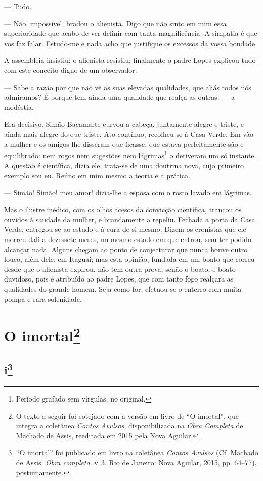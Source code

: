 --- Tudo.

--- Não, impossível, bradou o alienista. Digo que não sinto em mim essa
superioridade que acabo de ver definir com tanta magnificência. A
simpatia é que vos faz falar. Estudo-me e nada acho que justifique os
excessos da vossa bondade.

A assembleia insistiu; o alienista resistiu; finalmente o padre Lopes
explicou tudo com este conceito digno de um observador:

--- Sabe a razão por que não vê as suas elevadas qualidades, que aliás
todos nós admiramos? É porque tem ainda uma qualidade que realça as
outras: --- a modéstia.

Era decisivo. Simão Bacamarte curvou a cabeça, juntamente alegre e
triste, e ainda mais alegre do que triste. Ato contínuo, recolheu-se à
Casa Verde. Em vão a mulher e os amigos lhe disseram que ficasse, que
estava perfeitamente são e equilibrado: nem rogos nem sugestões nem
lágrimas\footnote{Período grafado sem vírgulas, no original.} o
detiveram um só instante. A questão é científica, dizia ele; trata-se de
uma doutrina nova, cujo primeiro exemplo sou eu. Reúno em mim mesmo a
teoria e a prática.

--- Simão! Simão! meu amor! dizia-lhe a esposa com o rosto lavado em
lágrimas.

Mas o ilustre médico, com os olhos acesos da convicção científica,
trancou os ouvidos à saudade da mulher, e brandamente a repeliu. Fechada
a porta da Casa Verde, entregou-se ao estudo e à cura de si mesmo. Dizem
os cronistas que ele morreu dali a dezessete meses, no mesmo estado em
que entrou, sem ter podido alcançar nada. Alguns chegam ao ponto de
conjecturar que nunca houve outro louco, além dele, em Itaguaí; mas esta
opinião, fundada em um boato que correu desde que o alienista expirou,
não tem outra prova, senão o boato; e boato duvidoso, pois é atribuído
ao padre Lopes, que com tanto fogo realçara as qualidades do grande
homem. Seja como for, efetuou-se o enterro com muita pompa e rara
solenidade.


\chapter{O imortal\footnote[*]{O texto a seguir foi cotejado com a versão
  em livro de ``O imortal'', que integra a coletânea \emph{Contos
  Avulsos}, disponibilizada na \emph{Obra Completa} de Machado de Assis,
  reeditada em 2015 pela Nova Aguilar.}}

\section*{i\protect\footnote[\dagger]{``\MakeUppercase{O}
  imortal'' foi publicado em livro na coletânea \emph{\MakeUppercase{C}ontos \MakeUppercase{A}vulsos} (\MakeUppercase{C}f. \MakeUppercase{M}achado de \MakeUppercase{A}ssis. \emph{\MakeUppercase{O}bra completa}. v.\,3. \MakeUppercase{R}io de \MakeUppercase{J}aneiro:
  \MakeUppercase{N}ova \MakeUppercase{A}guilar, 2015, pp. 64--77), postumamente.}}

